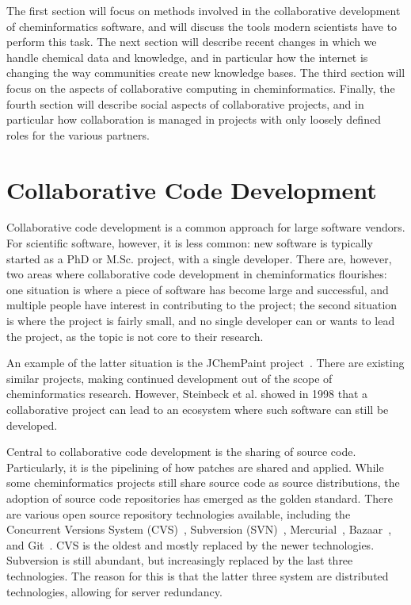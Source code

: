 \documentclass[11pt]{book}
\begin{document}
The first section will focus on methods involved in the collaborative
development of cheminformatics software, and will discuss the tools modern
scientists have to perform this task. The next section will describe
recent changes in which we handle chemical data and knowledge, and in
particular how the internet is changing the way communities create new
knowledge bases. The third section will focus on the aspects of
collaborative computing in cheminformatics. Finally, the fourth
section will describe social aspects of collaborative projects, and in
particular how collaboration is managed in projects with only loosely
defined roles for the various partners.

\section{Collaborative Code Development}

Collaborative code development is a common approach for large software vendors.
For scientific software, however, it is less common: new software is typically
started as a PhD or M.Sc. project, with a single developer. There are, however,
two areas where collaborative code development in cheminformatics flourishes:
one situation is where a piece of software has become large and successful,
and multiple people have interest in contributing to the project; the second
situation is where the project is fairly small, and no single developer can
or wants to lead the project, as the topic is not core to their research.

An example of the latter situation is the JChemPaint project~\cite{Krause2000}.
There are existing similar projects, making continued development out
of the scope of cheminformatics
research. However, Steinbeck et al. showed in 1998 that a collaborative project
can lead to an ecosystem where such software can still be
developed.

Central to collaborative code development is the sharing of source code. Particularly,
it is the pipelining of how patches are shared and applied. While some cheminformatics
projects still share source code as source distributions, the adoption of
source code repositories has emerged as the golden standard. There are various 
open source repository technologies available, including the Concurrent Versions System
(CVS)~\cite{url:cvs}, Subversion (SVN)~\cite{url:svn}, Mercurial~\cite{url:hg},
Bazaar~\cite{url:bazaar}, and Git~\cite{url:git}. CVS is the oldest and mostly replaced
by the newer technologies. Subversion is still abundant, but increasingly
replaced by the last three technologies. The reason for this is that
the latter three system are distributed technologies, allowing for server redundancy.
\end{document}
